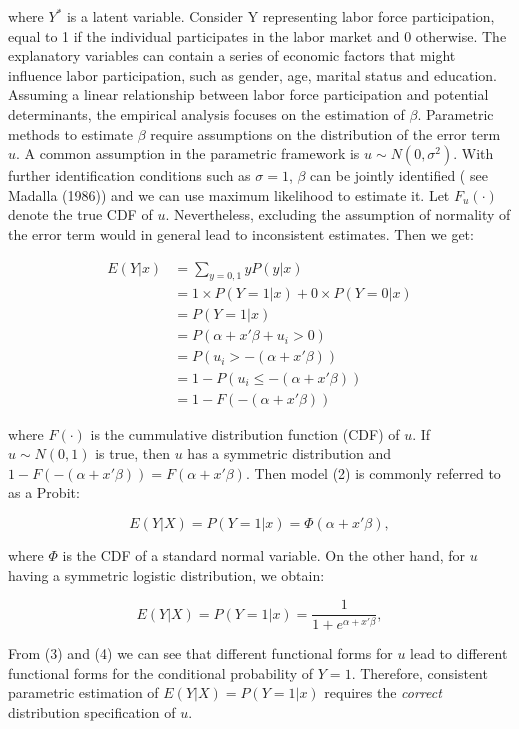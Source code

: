 \documentclass[a4paper]{article}
\begin{document}
where $Y^*$ is a latent variable.
Consider Y representing labor force participation, equal to 1 if the individual participates in the labor market and 0 otherwise. The explanatory variables can contain a series of economic factors that might influence labor participation, such as gender, age, marital status and education. Assuming a linear relationship between labor force participation and potential determinants, the empirical analysis focuses on the estimation of $\beta$.
Parametric methods to estimate $\beta$ require assumptions on the distribution of the error term $u$. A common assumption in the parametric framework is $ u \sim N(0, \sigma^2)$. With further identification conditions such as $\sigma = 1$, $\beta$ can be jointly identified ( see Madalla (1986)) and we can use maximum likelihood to estimate it.  Let $F_u(\cdot)$ denote the true CDF of $u$. Nevertheless, excluding the assumption of normality of the error term would in general lead to inconsistent estimates. Then we get:


\[ 
\begin{split}
E(Y|x) & = \sum_{y=0,1} yP(y|x) \\
 & = 1 \times P(Y=1|x) + 0 \times P(Y=0|x) \\
 & = P(Y=1|x) \\ 
 & = P(\alpha + x'\beta + u_i > 0) \\
 & = P(u_i > -(\alpha + x'\beta)) \\
 & = 1 - P(u_i \leq -(\alpha + x'\beta)) \\
 & = 1 - F(-(\alpha + x'\beta))
\end{split}
\]

where $F(\cdot)$ is the cummulative distribution function (CDF) of $u$. If $ u \sim N(0,1)$ is true, then $u$ has a symmetric distribution and $1 - F(-(\alpha + x'\beta)) = F(\alpha + x'\beta)$. Then model (2) is commonly referred to as a Probit:

\begin{equation}
E(Y|X) = P(Y=1|x) = \Phi(\alpha + x'\beta),
\end{equation}

where $\Phi$ is the CDF of a standard normal variable. On the other hand, for $u$ having a symmetric logistic distribution, we obtain:

\begin{equation}
E(Y|X) = P(Y=1|x) = \frac{1}{1 + e^{\alpha + x'\beta}},
\end{equation}

From (3) and (4) we can see that different functional forms for $u$ lead to different functional forms for the conditional probability of $Y = 1$. Therefore, consistent parametric estimation of $E(Y|X) = P(Y=1|x)$ requires the \textit{correct} distribution specification of $u$. 
\end{document}
